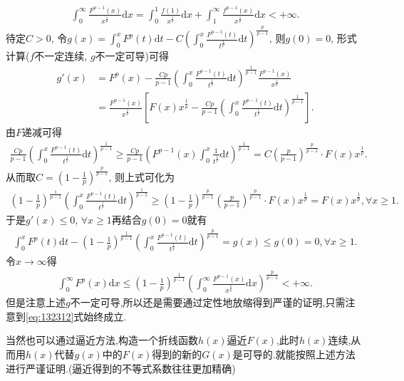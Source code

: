 \documentclass[../../main.tex]{subfiles}
\begin{document}
\begin{note}
\begin{align*}
\int_0^{\infty}{\frac{F^{p-1}\left( x \right)}{x^{\frac{1}{p}}}\mathrm{d}x}=\int_0^1{\frac{f\left( 1 \right)}{x^{\frac{1}{p}}}\mathrm{d}x}+\int_1^{\infty}{\frac{f^{p-1}\left( x \right)}{x^{\frac{1}{p}}}\mathrm{d}x}<+\infty .
\end{align*}
待定$C>0$, 令$g\left( x \right) =\int_0^x{F^p\left( t \right)}\mathrm{d}t-C\left( \int_0^x{\frac{F^{p-1}\left( t \right)}{t^{\frac{1}{p}}}\mathrm{d}t} \right) ^{\frac{p}{p-1}}$, 则$g\left( 0 \right) =0$, 形式计算($f$不一定连续, $g$不一定可导)可得
\begin{align*}
g' \left( x \right) &=F^p\left( x \right) -\frac{Cp}{p-1}\left( \int_0^x{\frac{F^{p-1}\left( t \right)}{t^{\frac{1}{p}}}\mathrm{d}t} \right) ^{\frac{1}{p-1}}\frac{F^{p-1}\left( x \right)}{x^{\frac{1}{p}}}\\
&=\frac{F^{p-1}\left( x \right)}{x^{\frac{1}{p}}}\left[ F\left( x \right) x^{\frac{1}{p}}-\frac{Cp}{p-1}\left( \int_0^x{\frac{F^{p-1}\left( t \right)}{t^{\frac{1}{p}}}\mathrm{d}t} \right) ^{\frac{1}{p-1}} \right] .
\end{align*}
由$F$递减可得
\begin{align*}
\frac{Cp}{p-1}\left( \int_0^x{\frac{F^{p-1}\left( t \right)}{t^{\frac{1}{p}}}\mathrm{d}t} \right) ^{\frac{1}{p-1}}\geqslant \frac{Cp}{p-1}\left( F^{p-1}\left( x \right) \int_0^x{\frac{1}{t^{\frac{1}{p}}}\mathrm{d}t} \right) ^{\frac{1}{p-1}}=C\left( \frac{p}{p-1} \right) ^{\frac{p}{p-1}}\cdot F\left( x \right) x^{\frac{1}{p}}.
\end{align*}
从而取$C=\left( 1-\frac{1}{p} \right) ^{\frac{p}{p-1}}$, 则上式可化为
\begin{align}
\left( 1-\frac{1}{p} \right) ^{\frac{1}{p-1}}\left( \int_0^x{\frac{F^{p-1}\left( t \right)}{t^{\frac{1}{p}}}\mathrm{d}t} \right) ^{\frac{1}{p-1}}\geqslant \left( 1-\frac{1}{p} \right) ^{\frac{p}{p-1}}\left( \frac{p}{p-1} \right) ^{\frac{p}{p-1}}\cdot F\left( x \right) x^{\frac{1}{p}}=F\left( x \right) x^{\frac{1}{p}},\forall x\geqslant 1.\label{eq:132312}
\end{align}
于是$g' \left( x \right) \leqslant 0$, $\forall x\geqslant 1$再结合$g\left( 0 \right) =0$就有
\begin{align*}
\int_0^x{F^p\left( t \right)}\mathrm{d}t-\left( 1-\frac{1}{p} \right) ^{\frac{1}{p-1}}\left( \int_0^x{\frac{F^{p-1}\left( t \right)}{t^{\frac{1}{p}}}\mathrm{d}t} \right) ^{\frac{p}{p-1}}=g\left( x \right) \leqslant g\left( 0 \right) =0,\forall x\geqslant 1.
\end{align*}
令$x\rightarrow \infty$得
\begin{align*}
\int_0^{\infty}{F^p\left( x \right)}\mathrm{d}x\leqslant \left( 1-\frac{1}{p} \right) ^{\frac{1}{p-1}}\left( \int_0^{\infty}{\frac{F^{p-1}\left( x \right)}{x^{\frac{1}{p}}}\mathrm{d}x} \right) ^{\frac{p}{p-1}}<+\infty .
\end{align*}
但是注意上述$g$不一定可导,所以还是需要通过定性地放缩得到严谨的证明,只需注意到\eqref{eq:132312}式始终成立.

当然也可以通过逼近方法,构造一个折线函数$h(x)$逼近$F(x)$,此时$h(x)$连续,从而用$h(x)$代替$g(x)$中的$F(x)$得到的新的$G(x)$是可导的.就能按照上述方法进行严谨证明.(逼近得到的不等式系数往往更加精确)
\end{note}
\end{document}
